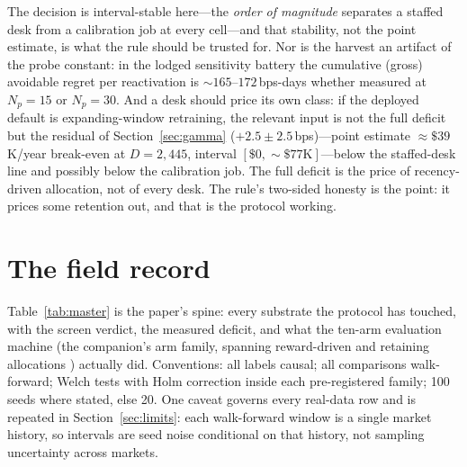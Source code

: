 \documentclass[sigconf,anonymous]{acmart}
\begin{document}
\noindent The decision is interval-stable here---the \emph{order of
magnitude} separates a staffed desk from a calibration job at every
cell---and that stability, not the point estimate, is what the rule
should be trusted for. Nor is the harvest an artifact of the probe
constant: in the lodged sensitivity battery the cumulative (gross)
avoidable regret per reactivation is ${\sim}165$--$172$\,bps-days
whether measured at $N_p{=}15$ or $N_p{=}30$. And a desk should price
its own class: if the deployed default is expanding-window retraining,
the relevant input is not the full deficit but the residual of
Section~\ref{sec:gamma} ($+2.5 \pm 2.5$\,bps)---point estimate
${\approx}\$39$K/year break-even at $D{=}2{,}445$, interval
$[\$0, {\sim}\$77\text{K}]$---below the staffed-desk line and possibly
below the calibration job. The full deficit is the price of
recency-driven allocation, not of every desk. The rule's two-sided honesty is
the point: it prices some retention out, and that is the protocol
working.

\section{The field record}
\label{sec:record}

Table~\ref{tab:master} is the paper's spine: every substrate the
protocol has touched, with the screen verdict, the measured deficit, and
what the ten-arm evaluation machine (the companion's arm family,
spanning reward-driven and retaining allocations \cite{companion2026})
actually did. Conventions: all labels causal; all comparisons
walk-forward; Welch tests with Holm correction inside each
pre-registered family; 100 seeds where stated, else 20. One caveat
governs every real-data row and is repeated in
Section~\ref{sec:limits}: each walk-forward window is a single market
history, so intervals are seed noise conditional on that history, not
sampling uncertainty across markets.
\end{document}
